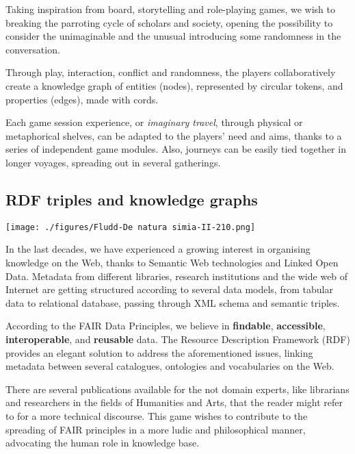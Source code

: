 \documentclass[12pt,a4paper]{book}
\theoremstyle{definition}
\begin{document}
Taking inspiration from board, storytelling and role-playing games, we wish to breaking the parroting cycle of scholars and society, opening the possibility to consider the unimaginable and the unusual introducing some randomness in the conversation. 

Through play, interaction, conflict and randomness, the players collaboratively create a knowledge graph of entities (nodes), represented by circular tokens, and properties (edges), made with cords. 

Each game session experience, or \textit{imaginary travel}, through physical or metaphorical shelves, can be adapted to the players' need and aims, thanks to a series of independent game modules. Also, journeys can be easily tied together in longer voyages, spreading out in several gatherings. 

\newpage

\subsection{RDF triples and knowledge graphs}

\begin{center}
\texttt{[image: ./figures/Fludd-De natura simia-II-210.png]}
\end{center}

In the last decades, we have experienced a growing interest in organising knowledge on the Web, thanks to Semantic Web technologies and Linked Open Data.
Metadata from different libraries, research institutions and the wide web of Internet are getting structured according to several data models, from tabular data to relational database, passing through XML schema and semantic triples. 

According to the FAIR Data Principles, we believe in \textbf{findable}, \textbf{accessible}, \textbf{interoperable}, and \textbf{reusable} data. The Resource Description Framework (RDF) provides an elegant solution to address the aforementioned issues, linking metadata between several catalogues, ontologies and vocabularies on the Web.

There are several publications available for the not domain experts, like librarians and researchers in the fields of Humanities and Arts, that the reader might refer to for a more technical discourse. This game wishes to contribute to the spreading of FAIR principles in a more ludic and philosophical manner, advocating the human role in knowledge base.

\newpage  
\end{document}
